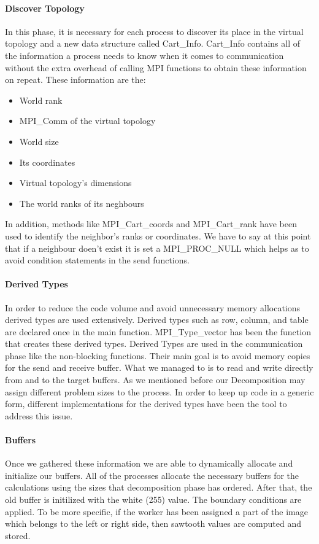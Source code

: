 \documentclass[12pt,a4paper]{article}
\begin{document}
        \paragraph{Discover Topology}
            In this phase, it is necessary for each process to discover its place in the virtual topology and a new data structure called Cart\_Info. Cart\_Info contains all of the information a process needs to know when it comes to communication without the extra overhead of calling MPI functions to obtain these information on repeat. These information are the:

            \begin{itemize}
			  \item World rank
			  \item MPI\_Comm of the virtual topology
			  \item World size
			  \item Its coordinates
			  \item Virtual topology's dimensions
			  \item The world ranks of its neghbours
			\end{itemize}

			In addition, methods like MPI\_Cart\_coords and MPI\_Cart\_rank have been used to identify the neighbor's ranks or coordinates. We have to say at this point that if a neighbour doen't exist it is set a MPI\_PROC\_NULL which helps as to avoid condition statements in the send functions.

        \paragraph{Derived Types}
            In order to reduce the code volume and avoid unnecessary memory allocations derived types are used extensively. Derived types such as row, column, and table are declared once in the main function. MPI\_Type\_vector has been the function that creates these derived types. Derived Types are used in the communication phase like the non-blocking functions. Their main goal is to avoid memory copies for the send and receive buffer. What we managed to is to read and write directly from and to the target buffers. As we mentioned before our Decomposition may assign different problem sizes to the process. In order to keep up code in a generic form, different implementations for the derived types have been the tool to address this issue.

        \paragraph{Buffers}
			Once we gathered these information we are able to dynamically allocate and initialize our buffers. All of the processes allocate the necessary buffers for the calculations using the sizes that decomposition phase has ordered. After that, the old buffer is initilized with the white (255) value. The boundary conditions are applied. To be more specific, if the worker has been assigned a part of the image which belongs to the left or right side, then sawtooth values are computed and stored.
\end{document}
